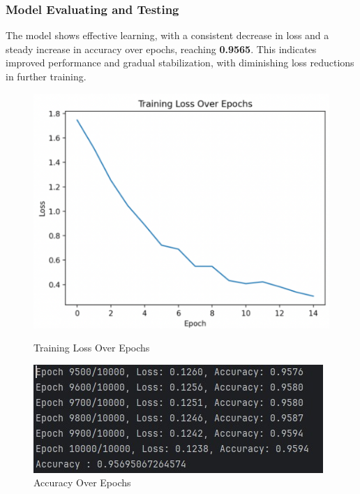 \documentclass[aspectratio=1610]{beamer}
\begin{document}
\begin{frame}
    \frametitle{Model Evaluating and Testing}

    The model shows effective learning, with a consistent decrease in loss and a steady increase in accuracy over epochs,
     reaching \textbf{0.9565}. This indicates improved performance and gradual stabilization,
     with diminishing loss reductions in further training.
   \begin{figure}[h]
        \begin{minipage}[t]{0.35\linewidth}
            \begin{flushleft}
                \includegraphics[width=\linewidth]{LossFunction.png}
                \caption{Training Loss Over Epochs }
                \label{fig:modelE}
            \end{flushleft}
        \end{minipage}
        \hfill
        \begin{minipage}[t]{0.5\linewidth}
            \begin{flushright}
                \includegraphics[width=\linewidth]{modelE.jpg}
                \caption{Accuracy Over Epochs}
                \label{fig:modelE}
            \end{flushright}
        \end{minipage}
    \end{figure}
    


    


\end{frame}
\end{document}
